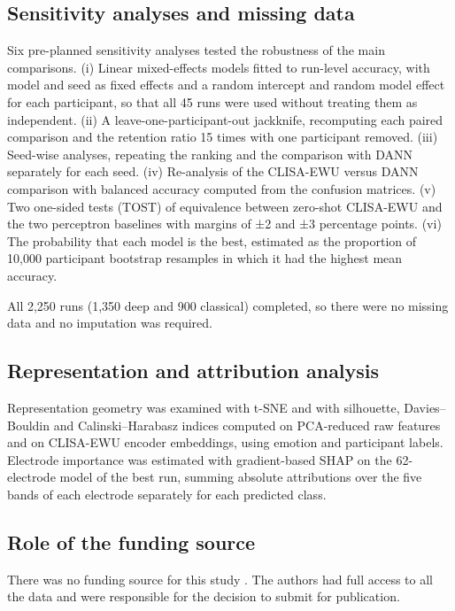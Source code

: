 \subsection{Sensitivity analyses and missing data}
Six pre-planned sensitivity analyses tested the robustness of the main comparisons. (i) Linear mixed-effects models\cite{laird} fitted to run-level accuracy, with model and seed as fixed effects and a random intercept and random model effect for each participant, so that all 45 runs were used without treating them as independent. (ii) A leave-one-participant-out jackknife\cite{efron}, recomputing each paired comparison and the retention ratio 15 times with one participant removed. (iii) Seed-wise analyses, repeating the ranking and the comparison with DANN separately for each seed. (iv) Re-analysis of the CLISA-EWU versus DANN comparison with balanced accuracy computed from the confusion matrices. (v) Two one-sided tests (TOST)\cite{schuirmann} of equivalence between zero-shot CLISA-EWU and the two perceptron baselines with margins of ±2 and ±3 percentage points. (vi) The probability that each model is the best, estimated as the proportion of 10,000 participant bootstrap resamples\cite{efron} in which it had the highest mean accuracy.

All 2,250 runs (1,350 deep and 900 classical) completed, so there were no missing data and no imputation was required.


\subsection{Representation and attribution analysis}
Representation geometry was examined with t-SNE\cite{tsne} and with silhouette\cite{silhouette}, Davies–Bouldin\cite{dbi} and Calinski–Harabasz\cite{chi} indices computed on PCA-reduced raw features and on CLISA-EWU encoder embeddings, using emotion and participant labels. Electrode importance was estimated with gradient-based SHAP\cite{shap} on the 62-electrode model of the best run, summing absolute attributions over the five bands of each electrode separately for each predicted class.


\subsection{Role of the funding source}
There was no funding source for this study . The authors had full access to all the data and were responsible for the decision to submit for publication.


